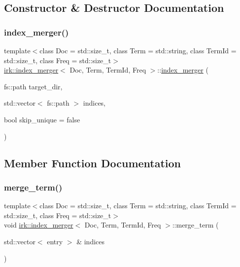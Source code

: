 \subsection{Constructor \& Destructor Documentation}
\mbox{\label{classirk_1_1index__merger_af76fffe4b1bc16a692b87f07ff046aaa}} 
\subsubsection{\texorpdfstring{index\+\_\+merger()}{index\_merger()}}
{\footnotesize\ttfamily template$<$class Doc  = std\+::size\+\_\+t, class Term  = std\+::string, class Term\+Id  = std\+::size\+\_\+t, class Freq  = std\+::size\+\_\+t$>$ \\
\mbox{\hyperlink{classirk_1_1index__merger}{irk\+::index\+\_\+merger}}$<$ Doc, Term, Term\+Id, Freq $>$\+::\mbox{\hyperlink{classirk_1_1index__merger}{index\+\_\+merger}} (\begin{DoxyParamCaption}\item[{fs\+::path}]{target\+\_\+dir,  }\item[{std\+::vector$<$ fs\+::path $>$}]{indices,  }\item[{bool}]{skip\+\_\+unique = {\ttfamily false} }\end{DoxyParamCaption})\hspace{0.3cm}{\ttfamily [inline]}}



\subsection{Member Function Documentation}
\mbox{\label{classirk_1_1index__merger_a285409fbb9e208ac3ad05076308e2826}} 
\subsubsection{\texorpdfstring{merge\+\_\+term()}{merge\_term()}}
{\footnotesize\ttfamily template$<$class Doc  = std\+::size\+\_\+t, class Term  = std\+::string, class Term\+Id  = std\+::size\+\_\+t, class Freq  = std\+::size\+\_\+t$>$ \\
void \mbox{\hyperlink{classirk_1_1index__merger}{irk\+::index\+\_\+merger}}$<$ Doc, Term, Term\+Id, Freq $>$\+::merge\+\_\+term (\begin{DoxyParamCaption}\item[{std\+::vector$<$ entry $>$ \&}]{indices }\end{DoxyParamCaption})\hspace{0.3cm}{\ttfamily [inline]}}


